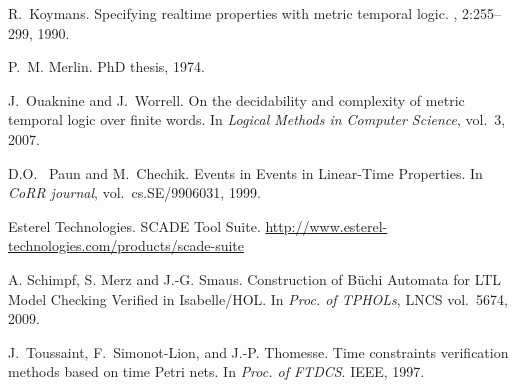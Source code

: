 \documentclass[a4paper]{scrartcl}
\begin{document}
{\begin{thebibliography}{10}
R.~Koymans.
\newblock Specifying realtime properties with metric temporal logic.
, 2:255--299,  1990.

P.~M. Merlin.
\newblock PhD thesis, 1974.

J.~Ouaknine and J.~Worrell.
\newblock On the decidability and complexity of metric temporal logic over
  finite words.
\newblock In {\em Logical Methods in Computer Science}, vol.~3, 2007.

D.O.~ Paun and M.~Chechik.
\newblock Events in Events in Linear-Time Properties.
\newblock In {\em CoRR journal}, vol.~cs.SE/9906031, 1999.

 Esterel Technologies. \newblock SCADE Tool
  Suite.\newblock
  \url{http://www.esterel-technologies.com/products/scade-suite}

 A. Schimpf, S. Merz and J.-G. Smaus.  \newblock
  Construction of Büchi Automata for LTL Model Checking Verified in
  Isabelle/HOL. \newblock In {\em Proc. of TPHOLs}, LNCS vol.~5674,
  2009.

J.~Toussaint, F.~Simonot-Lion, and J.-P. Thomesse.
\newblock Time constraints verification methods based on time {Petri} nets.
\newblock In {\em Proc. of FTDCS}. IEEE, 1997.
\end{thebibliography}}
\end{document}
